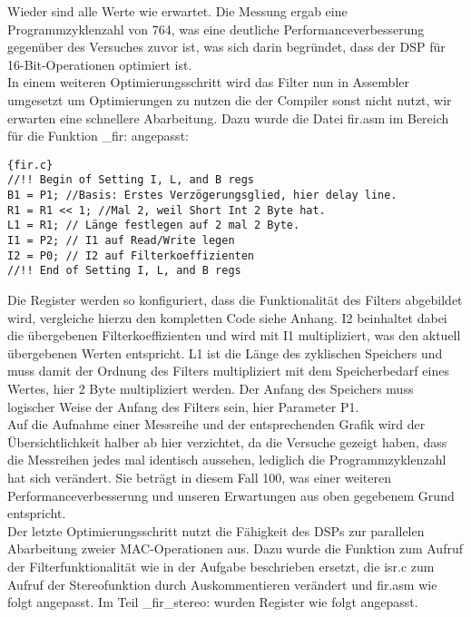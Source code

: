 Wieder sind alle Werte wie erwartet.
Die Messung ergab eine Programmzyklenzahl von 764, was eine deutliche Performanceverbesserung gegen\"uber des Versuches zuvor ist, was sich darin begr\"undet, dass der DSP f\"ur 16-Bit-Operationen optimiert ist.\\
In einem weiteren Optimierungsschritt wird das Filter nun in Assembler umgesetzt um Optimierungen zu nutzen die der Compiler sonst nicht nutzt, wir erwarten eine schnellere Abarbeitung.
Dazu wurde die Datei fir.asm im Bereich f\"ur die Funktion _fir: angepasst:
\begin{adjustbox}{width=\textwidth,height=\textheight,keepaspectratio}
 \begin{lstlisting}[title=fir.c]{fir.c}
//!! Begin of Setting I, L, and B regs	
B1 = P1; //Basis: Erstes Verzögerungsglied, hier delay line.
R1 = R1 << 1; //Mal 2, weil Short Int 2 Byte hat.
L1 = R1; // Länge festlegen auf 2 mal 2 Byte.
I1 = P2; // I1 auf Read/Write legen
I2 = P0; // I2 auf Filterkoeffizienten
//!! End of Setting I, L, and B regs

\end{lstlisting}
\end{adjustbox}
Die Register werden so konfiguriert, dass die Funktionalität des Filters abgebildet wird, vergleiche hierzu den kompletten Code siehe Anhang. I2 beinhaltet dabei die \"ubergebenen Filterkoeffizienten und wird mit I1 multipliziert, was den aktuell \"ubergebenen Werten entspricht. L1 ist die L\"ange des zyklischen Speichers und muss damit der Ordnung des Filters multipliziert mit dem Speicherbedarf eines Wertes, hier 2 Byte multipliziert werden. Der Anfang des Speichers muss logischer Weise der Anfang des Filters sein, hier Parameter P1.\\

Auf die Aufnahme einer Messreihe und der entsprechenden Grafik wird der Übersichtlichkeit halber ab hier verzichtet, da die Versuche gezeigt haben, dass die Messreihen jedes mal identisch aussehen, lediglich die Programmzyklenzahl hat sich verändert. Sie beträgt in diesem Fall 100, was einer weiteren Performanceverbesserung und unseren Erwartungen aus oben gegebenem Grund entspricht.\\
Der letzte Optimierungsschritt nutzt die Fähigkeit des DSPs zur parallelen Abarbeitung zweier MAC-Operationen aus. Dazu wurde die Funktion zum Aufruf der Filterfunktionalität wie in der Aufgabe beschrieben ersetzt, die isr.c zum Aufruf der Stereofunktion durch Auskommentieren verändert und fir.asm wie folgt angepasst. Im Teil _fir_stereo: wurden Register wie folgt angepasst.

